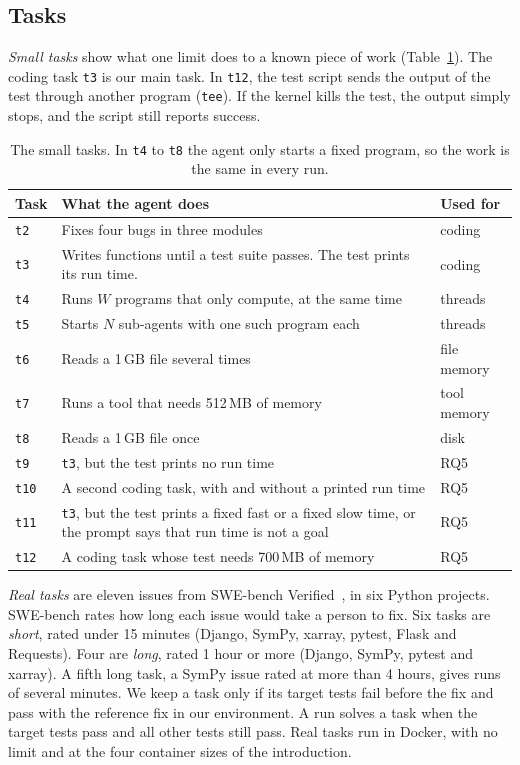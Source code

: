 \documentclass[sigconf,review,anonymous]{acmart}
\begin{document}
\subsection{Tasks}
\emph{Small tasks} show what one limit does to a known piece of work
(Table~\ref{tab:tasks}). The coding task \texttt{t3} is our main task.
In \texttt{t12}, the test script sends the output of the test through
another program (\texttt{tee}). If the kernel kills the test, the output
simply stops, and the script still reports success.

\begin{table}[t]
\caption{The small tasks. In \texttt{t4} to \texttt{t8} the agent only
starts a fixed program, so the work is the same in every run.}
\label{tab:tasks}
\small
\begin{tabular}{@{}lp{}l@{}}
\toprule
Task & What the agent does & Used for \\
\midrule
\texttt{t2} & Fixes four bugs in three modules & coding \\
\texttt{t3} & Writes functions until a test suite passes. The test prints its run time. & coding \\
\texttt{t4} & Runs $W$ programs that only compute, at the same time & threads \\
\texttt{t5} & Starts $N$ sub-agents with one such program each & threads \\
\texttt{t6} & Reads a 1\,GB file several times & file memory \\
\texttt{t7} & Runs a tool that needs 512\,MB of memory & tool memory \\
\texttt{t8} & Reads a 1\,GB file once & disk \\
\midrule
\texttt{t9} & \texttt{t3}, but the test prints no run time & RQ5 \\
\texttt{t10} & A second coding task, with and without a printed run time & RQ5 \\
\texttt{t11} & \texttt{t3}, but the test prints a fixed fast or a fixed slow time, or the prompt says that run time is not a goal & RQ5 \\
\texttt{t12} & A coding task whose test needs 700\,MB of memory & RQ5 \\
\bottomrule
\end{tabular}
\end{table}

\emph{Real tasks} are eleven issues from SWE-bench
Verified~\cite{jimenez2024,swebenchverified}, in six Python projects.
SWE-bench rates how long each issue would take a person to fix. Six
tasks are \emph{short}, rated under 15 minutes (Django, SymPy, xarray,
pytest, Flask and Requests). Four are \emph{long}, rated 1 hour or more
(Django, SymPy, pytest and xarray). A fifth long task, a SymPy issue
rated at more than 4 hours, gives runs of several minutes. We keep a
task only if its target tests fail before the fix and pass with the
reference fix in our environment. A run solves a task when the target
tests pass and all other tests still pass. Real tasks run in Docker,
with no limit and at the four container sizes of the introduction.
\end{document}
